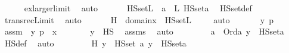 \begin{isabellebody}
\ \ \ \ \isamarkupfalse%
\ ex{\isacharunderscore}{\kern0pt}larger{\isacharunderscore}{\kern0pt}limit\ \isamarkupfalse%
\ auto\ \isanewline
\ \ \isamarkupfalse%
\ \isamarkupfalse%
\ {\isachardoublequoteopen}HS{\isacharunderscore}{\kern0pt}set{\isacharparenleft}{\kern0pt}L{\isacharparenright}{\kern0pt}\ {\isacharequal}{\kern0pt}\ {\isacharparenleft}{\kern0pt}{\isasymUnion}a\ {\isacharless}{\kern0pt}\ L{\isachardot}{\kern0pt}\ HS{\isacharunderscore}{\kern0pt}set{\isacharparenleft}{\kern0pt}a{\isacharparenright}{\kern0pt}{\isacharparenright}{\kern0pt}{\isachardoublequoteclose}\ \isamarkupfalse%
\ HS{\isacharunderscore}{\kern0pt}set{\isacharunderscore}{\kern0pt}def\ \isamarkupfalse%
\ transrec{}{\isacharunderscore}{\kern0pt}Limit\ \isamarkupfalse%
\ auto\ \isanewline
\ \ \isamarkupfalse%
\ \isamarkupfalse%
\ H\ {\isacharcolon}{\kern0pt}\ {\isachardoublequoteopen}domain{\isacharparenleft}{\kern0pt}x{\isacharparenright}{\kern0pt}\ {\isasymsubseteq}\ HS{\isacharunderscore}{\kern0pt}set{\isacharparenleft}{\kern0pt}L{\isacharparenright}{\kern0pt}{\isachardoublequoteclose}\ \isanewline
\ \ \isamarkupfalse%
\ {\isacharparenleft}{\kern0pt}auto{\isacharparenright}{\kern0pt}\ \isanewline
\ \ \ \ \isamarkupfalse%
\ y\ p\ \isamarkupfalse%
\ assm\ {\isacharcolon}{\kern0pt}\ {\isachardoublequoteopen}{\isacharless}{\kern0pt}y{\isacharcomma}{\kern0pt}\ p{\isachargreater}{\kern0pt}\ {\isasymin}\ x{\isachardoublequoteclose}\isanewline
\ \ \ \ \isamarkupfalse%
\ \isamarkupfalse%
\ {\isachardoublequoteopen}y\ {\isasymin}\ HS{\isachardoublequoteclose}\ \isamarkupfalse%
\ assms\ \isamarkupfalse%
\ auto\ \isanewline
\ \ \ \ \isamarkupfalse%
\ \isamarkupfalse%
\ a\ \ {\isachardoublequoteopen}Ord{\isacharparenleft}{\kern0pt}a{\isacharparenright}{\kern0pt}{\isachardoublequoteclose}\ {\isachardoublequoteopen}y\ {\isasymin}\ HS{\isacharunderscore}{\kern0pt}set{\isacharparenleft}{\kern0pt}a{\isacharparenright}{\kern0pt}{\isachardoublequoteclose}\ \isamarkupfalse%
\ HS{\isacharunderscore}{\kern0pt}def\ \isamarkupfalse%
\ auto\ \isanewline
\ \ \ \ \isamarkupfalse%
\ \isamarkupfalse%
\ H{\isacharcolon}{\kern0pt}\ {\isachardoublequoteopen}y\ {\isasymin}\ HS{\isacharunderscore}{\kern0pt}set{\isacharparenleft}{\kern0pt}{\isasymmu}\ a{\isachardot}{\kern0pt}\ y\ {\isasymin}\ HS{\isacharunderscore}{\kern0pt}set{\isacharparenleft}{\kern0pt}a{\isacharparenright}{\kern0pt}{\isacharparenright}{\kern0pt}{\isachardoublequoteclose}\ \isanewline

\end{isabellebody}
